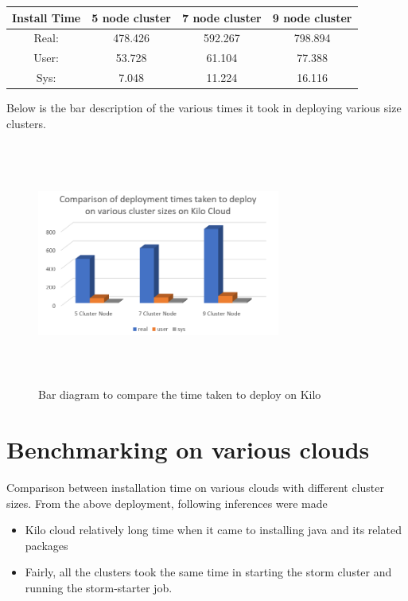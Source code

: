 \documentclass[9pt,twocolumn,twoside]{../../styles/osajnl}
\begin{document}

\begin{center}
 \begin{tabular}{|c|| c c c|} 
 \hline
 Install Time &  5 node cluster & 7 node cluster & 9 node cluster\\ [0.5ex]
 \hline\hline
 Real: & 478.426 & 592.267 & 798.894 \\ 
 \hline
 User: & 53.728 & 61.104 & 77.388 \\
 \hline
 Sys: & 7.048 & 11.224 & 16.116 \\
 \hline
\end{tabular}
\end{center}


Below is the bar description of the various times it took in deploying various size clusters.

\begin{figure}[!htb]
  \includegraphics[width=8cm,height=8cm,keepaspectratio,width=\linewidth]{images/bar-3.png}
  \caption{Bar diagram to compare the time taken to deploy on Kilo}
  \label{Bar diagram to compare the time taken to deploy on Kilo}
\end{figure}

\section{Benchmarking on various clouds}

Comparison between installation time on various clouds with different cluster sizes. From the above deployment, following inferences were made

\begin{itemize}
\item Kilo cloud relatively long time when it came to installing java and its related packages
\item Fairly, all the clusters took the same time in starting the storm cluster and running the storm-starter job.
\end{itemize}
\end{document}
